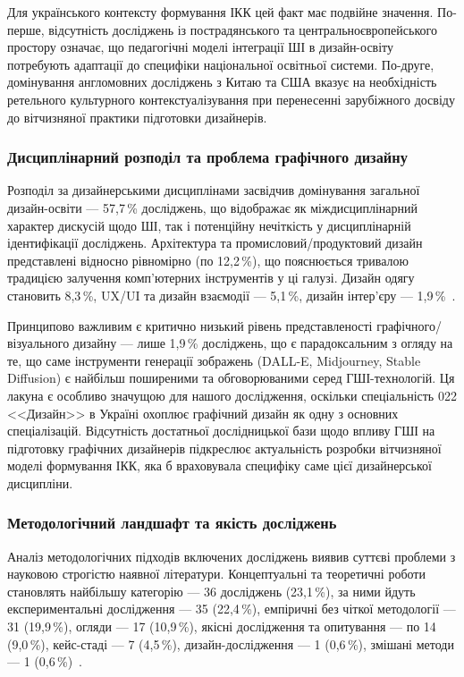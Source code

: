 Для українського контексту формування ІКК цей факт має подвійне значення. По-перше, відсутність досліджень із пострадянського та центральноєвропейського простору означає, що педагогічні моделі інтеграції ШІ в дизайн-освіту потребують адаптації до специфіки національної освітньої системи. По-друге, домінування англомовних досліджень з Китаю та США вказує на необхідність ретельного культурного контекстуалізування при перенесенні зарубіжного досвіду до вітчизняної практики підготовки дизайнерів.

\subsubsection{Дисциплінарний розподіл та проблема графічного дизайну}\label{sssec:1.2.3}

Розподіл за дизайнерськими дисциплінами засвідчив домінування загальної дизайн-освіти --- 57,7\,\% досліджень, що відображає як міждисциплінарний характер дискусій щодо ШІ, так і потенційну нечіткість у дисциплінарній ідентифікації досліджень. Архітектура та промисловий/продуктовий дизайн представлені відносно рівномірно (по 12,2\,\%), що пояснюється тривалою традицією залучення комп'ютерних інструментів у ці галузі. Дизайн одягу становить 8,3\,\%, UX/UI та дизайн взаємодії --- 5,1\,\%, дизайн інтер'єру --- 1,9\,\%~\cite{Musiienko2026ScopingReview}.

Принципово важливим є критично низький рівень представленості графічного/візуального дизайну --- лише 1,9\,\% досліджень, що є парадоксальним з огляду на те, що саме інструменти генерації зображень (DALL-E, Midjourney, Stable Diffusion) є найбільш поширеними та обговорюваними серед ГШІ-технологій. Ця лакуна є особливо значущою для нашого дослідження, оскільки спеціальність 022 <<Дизайн>> в Україні охоплює графічний дизайн як одну з основних спеціалізацій. Відсутність достатньої дослідницької бази щодо впливу ГШІ на підготовку графічних дизайнерів підкреслює актуальність розробки вітчизняної моделі формування ІКК, яка б враховувала специфіку саме цієї дизайнерської дисципліни.

\subsubsection{Методологічний ландшафт та якість досліджень}\label{sssec:1.2.4}

Аналіз методологічних підходів включених досліджень виявив суттєві проблеми з науковою строгістю наявної літератури. Концептуальні та теоретичні роботи становлять найбільшу категорію --- 36 досліджень (23,1\,\%), за ними йдуть експериментальні дослідження --- 35 (22,4\,\%), емпіричні без чіткої методології --- 31 (19,9\,\%), огляди --- 17 (10,9\,\%), якісні дослідження та опитування --- по 14 (9,0\,\%), кейс-стаді --- 7 (4,5\,\%), дизайн-дослідження --- 1 (0,6\,\%), змішані методи --- 1 (0,6\,\%)~\cite{Musiienko2026ScopingReview}.

